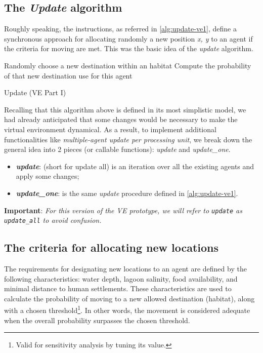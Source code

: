 \subsection{The \emph{Update} algorithm}
Roughly speaking, the instructions, as referred in \autoref{alg:update-ve1}, define a synchronous approach for allocating randomly a new position \emph{x, y} to an agent if the criteria for moving are met. This was the basic idea of the \emph{update} algorithm.

\vspace{0.4cm}
\begin{algorithm}[H]
    \SetAlgoLined
    Randomly choose a new destination within an  habitat\;
    Compute the probability of that new destination use for this agent \;
    \caption{Update (VE Part I) \label{alg:update-ve1}}
\end{algorithm}
\vspace{0.4cm}

Recalling that this algorithm above is defined in its most simplistic model, we had already anticipated that some changes would be necessary to make the virtual environment dynamical. As a result, to implement additional functionalities like \emph{multiple-agent update per processing unit}, we break down the general idea into 2 pieces (or callable functions): \emph{update} and \emph{update\_one}.
\begin{itemize}
    \item \textbf{\textit{update}}: (short for update all) is an iteration over all the existing agents and apply some changes;
    \item \textbf{\textit{update\_one}}: is the same \emph{update} procedure defined in \autoref{alg:update-ve1}.
\end{itemize}
\noindent
\textbf{Important}: \textit{For this version of the VE prototype, we will refer to \texttt{update} as \texttt{update\_all} to avoid confusion.}

\subsection{The criteria for allocating new locations}
The requirements for designating new locations to an agent are defined by the following characteristics: water depth, lagoon salinity, food availability, and minimal distance to human settlements. These characteristics are used to calculate the probability of moving to a new allowed destination (habitat), along with a chosen threshold\footnote{Valid for sensitivity analysis by tuning its value.}. In other words, the movement is considered adequate when the overall probability surpasses the chosen threshold.

